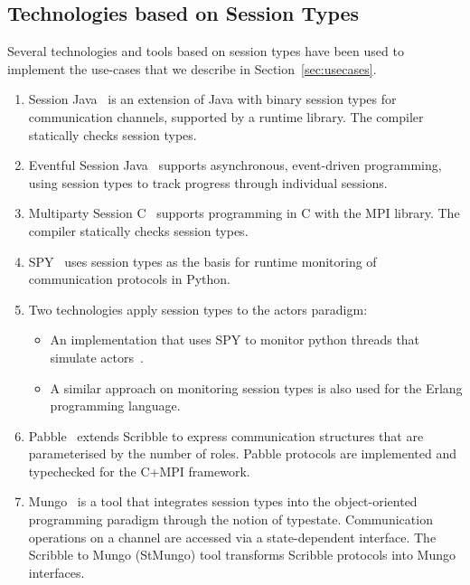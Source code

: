 \subsection{Technologies based on Session Types}

Several technologies and tools based on session types have been used to implement the use-cases that we describe in Section~\ref{sec:usecases}.
%
\begin{enumerate}
	\item	Session Java~\cite{HU07TYPE-SAFE} is an extension of Java with binary session types for communication channels, supported by a runtime library. The compiler statically checks session types. 

	\item	Eventful Session Java~\cite{event} supports asynchronous, event-driven programming, using session types to track progress through individual sessions.

	\item	Multiparty Session C~\cite{NYH12} supports programming in C with the MPI library. The compiler statically checks session types. 

	\item	SPY~\cite{DBLP:conf/rv/NeykovaYH13} uses session types as the basis for runtime monitoring of communication protocols in Python.

	\item	Two technologies apply session types to the actors paradigm:
			\begin{itemize}
				\item	An implementation that uses SPY to
						monitor python threads that simulate actors~\cite{DBLP:conf/coordination/NeykovaY14}.
				\item	A similar approach on monitoring session types is also used for the
						Erlang programming language. %
			\end{itemize}

	\item	Pabble~\cite{DBLP:conf/pdp/NgY14} extends Scribble to express
			communication structures that are parameterised by the number of roles.
			Pabble protocols are implemented and typechecked for the C+MPI framework.

	\item	Mungo~\cite{mungo} is a tool that integrates session types into the object-oriented
			programming paradigm through the notion of typestate. Communication
			operations on a channel are accessed via a state-dependent interface.
			The Scribble to Mungo (StMungo) tool transforms Scribble
			protocols into Mungo interfaces.



\end{enumerate}
